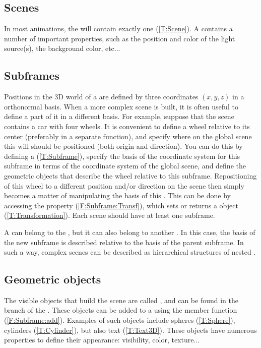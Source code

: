 \subsection{Scenes}
In most animations, the  will contain exactly one  (\ref{T:Scene}). A  contains a number of important properties, such as the position and color of the light source(s), the background color, etc...

\subsection{Subframes}
Positions in the 3D world of a  are defined by three coordinates $(x,y,z)$ in a orthonormal basis. When a more complex scene is built, it is often useful to define a part of it in a different basis. For example, suppose that the scene contains a car with four wheels. It is convenient to define a wheel relative to its center (preferably in a separate function), and specify where on the global scene this will should be positioned (both origin and direction). You can do this by defining a  (\ref{T:Subframe}), specify the basis of the coordinate system for this subframe in terms of the coordinate system of the global scene, and define the geometric objects that describe the wheel relative to this subframe. Repositioning of this wheel to a different position and/or direction on the scene then simply becomes a matter of manipulating the basis of this . This can be done by accessing the property  (\ref{F:Subframe:Transf}), which sets or returns a  object (\ref{T:Transformation}). Each scene should have at least one subframe.


A  can belong to the , but it can also belong to another . In this case, the basis of the new subframe is described relative to the basis of the parent subframe. In such a way, complex scenes can be described as hierarchical structures of nested .

\subsection{Geometric objects}
The visible objects that build the scene are called , and can be found in the  branch of the \functionspanel. These objects can be added to a  using the member function  (\ref{F:Subframe:add}). Examples of such objects include spheres (\ref{T:Sphere}), cylinders (\ref{T:Cylinder}), but also text (\ref{T:Text3D}). These objects have numerous properties to define their appearance: visibility, color, texture...

